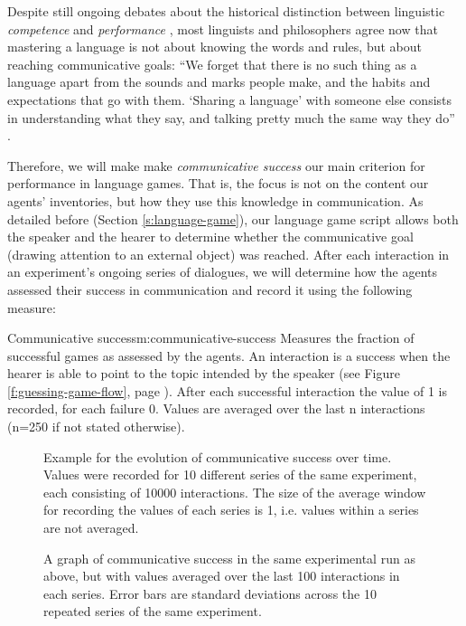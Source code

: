 Despite still ongoing debates about the historical distinction between
linguistic \emph{competence} and \emph{performance}
\citep{chomsky65aspects}, most linguists and philosophers agree now
that mastering a language is not about knowing the words and rules,
but about reaching communicative goals: ``We forget that there is no
such thing as a language apart from the sounds and marks people make,
and the habits and expectations that go with them. `Sharing a
language' with someone else consists in understanding what they say,
and talking pretty much the same way they do''
\citep[p. 131]{davidson05truth}. 

Therefore, we will make make \emph{communicative
  success} our main criterion for performance in language games. That
is, the focus is not on the content our agents' inventories, but how
they use this knowledge in communication. As detailed before (Section
\ref{s:language-game}), our language game script allows both the
speaker and the hearer to determine whether the communicative goal
(drawing attention to an external object) was reached. After each
interaction in an experiment's ongoing series of dialogues, we will
determine how the agents assessed their success in communication and
record it using the following measure:

\begin{measure}[h]{Communicative success}{m:communicative-success}
  Measures the fraction of successful games as assessed by the agents.
  An interaction is a success when the hearer is able to point to the
  topic intended by the speaker (see Figure
  \ref{f:guessing-game-flow}, page
  \pageref{f:guessing-game-flow}). After each successful interaction
  the value of 1 is recorded, for each failure 0. Values are averaged
  over the last n interactions (n=250 if not stated otherwise).
\end{measure}

\startfiguregroup
\begin{figure}[p]
  \caption{Example for the evolution of communicative success over
    time. Values were recorded for 10 different series of the same
    experiment, each consisting of 10000 interactions. The size of the
    average window for recording the values of each series is 1,
    i.e. values within a series are not averaged.}
  \label{f:communicative-success-example-average-window-1}
\end{figure}

\begin{figure}[p]
  \caption{A graph of communicative success in the same experimental
    run as above, but with values averaged over the last 100
    interactions in each series. Error bars are standard deviations
    across the 10 repeated series of the same experiment.}
  \label{f:communicative-success-example-average-window-100}
\end{figure}

